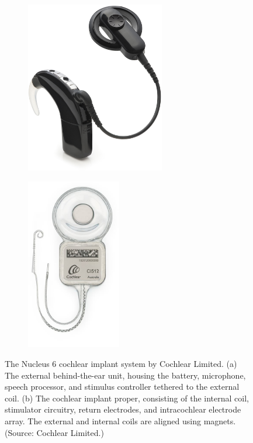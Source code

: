 \begin{figure}[p]
    \centering
    \begin{subfigure}[t]{0.4\textwidth}
        \centering
        \includegraphics[height=7.5cm]{Background/CI_external_C920}
        \caption{ }
        \label{fig:nucleus_parts_ext}
    \end{subfigure}
    \hspace{1cm}
    \begin{subfigure}[t]{0.4\textwidth}
        \centering
        \includegraphics[height=7.5cm]{Background/CI_internal_CI512}
        \caption{ }
        \label{fig:nucleus_parts_int}
    \end{subfigure}
    
	\caption[The Nucleus 6 cochlear implant system by Cochlear Limited]{The Nucleus
	6 cochlear implant system by Cochlear Limited. (a) The external behind-the-ear
	unit, housing the battery, microphone, speech processor, and stimulus
	controller tethered to the external coil. (b) The cochlear implant proper,
	consisting of the internal coil, stimulator circuitry, return electrodes, and
	intracochlear electrode array. The external and internal coils are
	aligned using magnets. (Source:	Cochlear Limited.)}
	\label{fig:nucleus_parts}
\end{figure}

